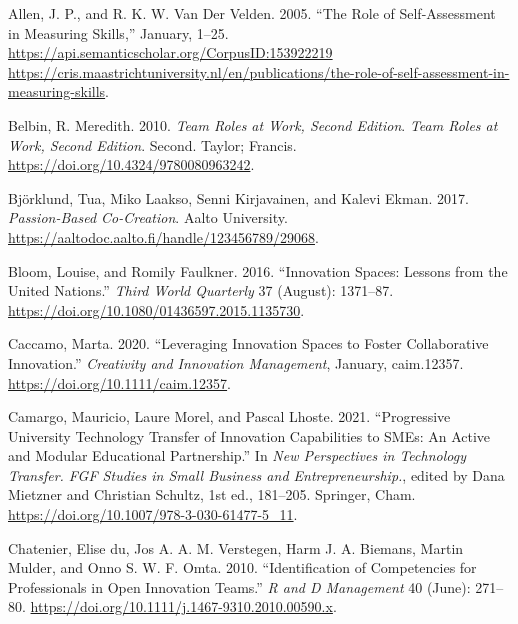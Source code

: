 \documentclass[AMA,STIX1COL,APA,STIX2COL]{WileyNJD-v2}
\newlength{\cslhangindent}
\newenvironment{CSLReferences}[2] %
 {%
  \setlength{\parindent}{0pt}
  \ifodd #1 \everypar{\setlength{\hangindent}{\cslhangindent}}\ignorespaces\fi
  \ifnum #2 > 0
  \setlength{\parskip}{#2\baselineskip}
  \fi
 }%
 {}
\begin{document}
\hypertarget{refs}{}
\begin{CSLReferences}{1}{0}
\leavevmode{}%
Allen, J. P., and R. K. W. Van Der Velden. 2005. {``The Role of
Self-Assessment in Measuring Skills,''} January, 1--25.
\href{https://api.semanticscholar.org/CorpusID:153922219\%20https://cris.maastrichtuniversity.nl/en/publications/the-role-of-self-assessment-in-measuring-skills}{https://api.semanticscholar.org/CorpusID:153922219
https://cris.maastrichtuniversity.nl/en/publications/the-role-of-self-assessment-in-measuring-skills}.

\leavevmode{}%
Belbin, R. Meredith. 2010. \emph{Team Roles at Work, Second Edition}.
\emph{Team Roles at Work, Second Edition}. Second. Taylor; Francis.
\url{https://doi.org/10.4324/9780080963242}.

\leavevmode{}%
Björklund, Tua, Miko Laakso, Senni Kirjavainen, and Kalevi Ekman. 2017.
\emph{Passion-Based Co-Creation}. Aalto University.
\url{https://aaltodoc.aalto.fi/handle/123456789/29068}.

\leavevmode{}%
Bloom, Louise, and Romily Faulkner. 2016. {``Innovation Spaces: Lessons
from the United Nations.''} \emph{Third World Quarterly} 37 (August):
1371--87. \url{https://doi.org/10.1080/01436597.2015.1135730}.

\leavevmode{}%
Caccamo, Marta. 2020. {``Leveraging Innovation Spaces to Foster
Collaborative Innovation.''} \emph{Creativity and Innovation
Management}, January, caim.12357.
\url{https://doi.org/10.1111/caim.12357}.

\leavevmode{}%
Camargo, Mauricio, Laure Morel, and Pascal Lhoste. 2021. {``Progressive
University Technology Transfer of Innovation Capabilities to SMEs: An
Active and Modular Educational Partnership.''} In \emph{New Perspectives
in Technology Transfer. FGF Studies in Small Business and
Entrepreneurship.}, edited by Dana Mietzner and Christian Schultz, 1st
ed., 181--205. Springer, Cham.
\url{https://doi.org/10.1007/978-3-030-61477-5_11}.

\leavevmode{}%
Chatenier, Elise du, Jos A. A. M. Verstegen, Harm J. A. Biemans, Martin
Mulder, and Onno S. W. F. Omta. 2010. {``Identification of Competencies
for Professionals in Open Innovation Teams.''} \emph{R and D Management}
40 (June): 271--80.
\url{https://doi.org/10.1111/j.1467-9310.2010.00590.x}.


\end{CSLReferences}
\end{document}
